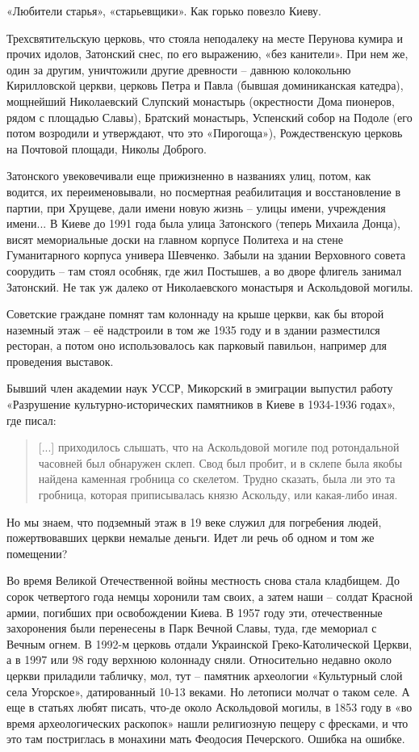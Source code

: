 «Любители старья», «старьевщики». Как горько повезло Киеву.

Трехсвятительскую церковь, что стояла неподалеку на месте Перунова кумира и прочих идолов, Затонский снес, по его выражению, «без канители». При нем же, один за другим, уничтожили другие древности – давнюю колокольню Кирилловской церкви, церковь Петра и Павла (бывшая доминиканская катедра), мощнейший Николаевский Слупский монастырь (окрестности Дома пионеров, рядом с площадью Славы), Братский монастырь, Успенский собор на Подоле (его потом возродили и утверждают, что это «Пирогоща»), Рождественскую церковь на Почтовой площади, Николы Доброго.
 
Затонского увековечивали еще прижизненно в названиях улиц, потом, как водится, их переименовывали, но посмертная реабилитация и восстановление в партии, при Хрущеве, дали имени новую жизнь – улицы имени, учреждения имени... В Киеве до 1991 года была улица Затонского (теперь Михаила Донца), висят мемориальные доски на главном корпусе Политеха и на стене Гуманитарного корпуса универа Шевченко. Забыли на здании Верховного совета соорудить – там стоял особняк, где жил Постышев, а во дворе флигель занимал Затонский. Не так уж далеко от Николаевского монастыря и Аскольдовой могилы.

Советские граждане помнят там колоннаду на крыше церкви, как бы второй наземный этаж – её надстроили в том же 1935 году и в здании разместился ресторан, а потом оно использовалось как парковый павильон, например для проведения выставок.

Бывший член академии наук УССР, Микорский в эмиграции выпустил работу «Разрушение культурно-исторических памятников в Киеве в 1934-1936 годах»\cite{mikorsky01}, где писал:

\begin{quotation}
[...] приходилось слышать, что на Аскольдовой могиле под ротондальной часовней был обнаружен склеп. Свод был пробит, и в склепе была якобы найдена каменная гробница со скелетом. Трудно сказать, была ли это та гробница, которая приписывалась князю Аскольду, или какая-либо иная.
\end{quotation}

Но мы знаем, что подземный этаж в 19 веке служил для погребения людей, пожертвовавших церкви немалые деньги. Идет ли речь об одном и том же помещении?

Во время Великой Отечественной войны местность снова стала кладбищем. До сорок четвертого года немцы хоронили там своих, а затем наши – солдат Красной армии, погибших при освобождении Киева. В 1957 году эти, отечественные захоронения были перенесены в Парк Вечной Славы, туда, где мемориал с Вечным огнем. В 1992-м церковь отдали Украинской Греко-Католи\-ческой Церкви, а в 1997 или 98 году верхнюю колоннаду сняли. Относительно недавно около церкви приладили табличку, мол, тут – памятник археологии «Культурный слой села Угорское», датированный 10-13 веками. Но летописи молчат о таком селе. А еще в статьях любят писать, что-де около Аскольдовой могилы, в 1853 году в «во время археологических раскопок» нашли религиозную пещеру с фресками, и что это там постриглась в монахини мать Феодосия Печерского. Ошибка на ошибке.

